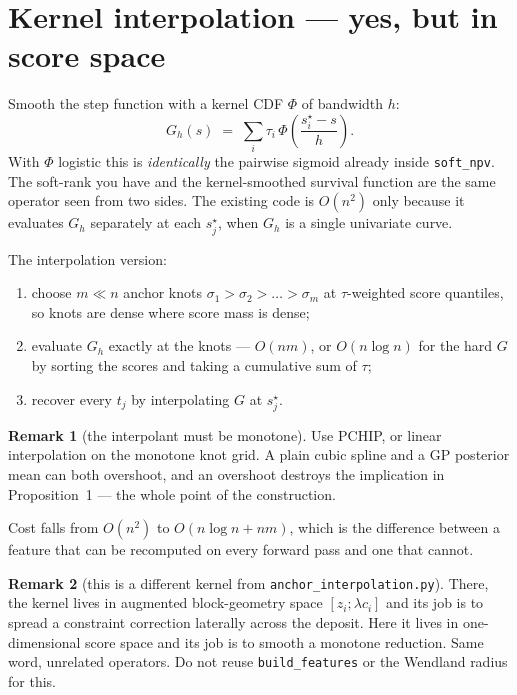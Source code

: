 \documentclass[11pt,a4paper]{article}
\newcommand{\sstar}{s^{\star}}
\theoremstyle{definition}
\newtheorem{remark}{Remark}
\begin{document}
\section{Kernel interpolation --- yes, but in score space}

Smooth the step function with a kernel CDF $\Phi$ of bandwidth $h$:
\[
  G_h(s) \;=\; \sum_i \tau_i \,\Phi\!\left(\frac{\sstar_i - s}{h}\right).
\]
With $\Phi$ logistic this is \emph{identically} the pairwise sigmoid already inside
\texttt{soft\_npv}. The soft-rank you have and the kernel-smoothed survival function are the same
operator seen from two sides. The existing code is $O(n^2)$ only because it evaluates $G_h$
separately at each $\sstar_j$, when $G_h$ is a single univariate curve.

The interpolation version:
\begin{enumerate}[leftmargin=1.4em,itemsep=1pt]
  \item choose $m \ll n$ anchor knots $\sigma_1 > \sigma_2 > \dots > \sigma_m$ at
        $\tau$-weighted score quantiles, so knots are dense where score mass is dense;
  \item evaluate $G_h$ exactly at the knots --- $O(nm)$, or $O(n\log n)$ for the hard $G$ by
        sorting the scores and taking a cumulative sum of $\tau$;
  \item recover every $t_j$ by interpolating $G$ at $\sstar_j$.
\end{enumerate}

\begin{remark}[the interpolant must be monotone]
Use PCHIP, or linear interpolation on the monotone knot grid. A plain cubic spline and a GP
posterior mean can both overshoot, and an overshoot destroys the implication in Proposition~1 ---
the whole point of the construction.
\end{remark}

Cost falls from $O(n^2)$ to $O(n\log n + nm)$, which is the difference between a feature that can
be recomputed on every forward pass and one that cannot.

\begin{remark}[this is a different kernel from \texttt{anchor\_interpolation.py}]
There, the kernel lives in augmented block-geometry space $[z_i;\lambda c_i]$ and its job is to
spread a constraint correction laterally across the deposit. Here it lives in one-dimensional
score space and its job is to smooth a monotone reduction. Same word, unrelated operators. Do not
reuse \texttt{build\_features} or the Wendland radius for this.
\end{remark}
\end{document}
